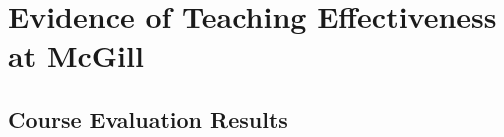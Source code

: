 \documentclass[a4paper,11pt]{report}
\begin{document}


\section{Evidence of Teaching Effectiveness at McGill}

\subsection{Course Evaluation Results}
\end{document}
